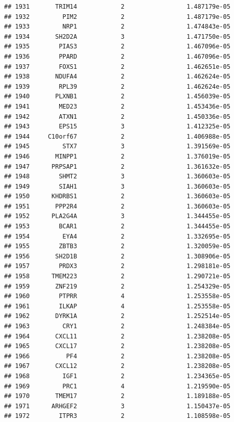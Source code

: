 \documentclass[
]{article}
\begin{document}
\begin{verbatim}
## 1931       TRIM14            2                 1.487179e-05
## 1932         PIM2            2                 1.487179e-05
## 1933         NRP1            2                 1.474843e-05
## 1934       SH2D2A            3                 1.471750e-05
## 1935        PIAS3            2                 1.467096e-05
## 1936        PPARD            2                 1.467096e-05
## 1937        FOXS1            2                 1.462651e-05
## 1938       NDUFA4            2                 1.462624e-05
## 1939        RPL39            2                 1.462624e-05
## 1940       PLXNB1            2                 1.456039e-05
## 1941        MED23            2                 1.453436e-05
## 1942        ATXN1            2                 1.450336e-05
## 1943        EPS15            3                 1.412325e-05
## 1944     C10orf67            2                 1.406988e-05
## 1945         STX7            3                 1.391569e-05
## 1946       MINPP1            2                 1.376019e-05
## 1947      PRPSAP1            2                 1.361632e-05
## 1948        SHMT2            3                 1.360603e-05
## 1949        SIAH1            3                 1.360603e-05
## 1950      KHDRBS1            2                 1.360603e-05
## 1951       PPP2R4            2                 1.360603e-05
## 1952      PLA2G4A            3                 1.344455e-05
## 1953        BCAR1            2                 1.344455e-05
## 1954         EYA4            2                 1.332695e-05
## 1955        ZBTB3            2                 1.320059e-05
## 1956       SH2D1B            2                 1.308906e-05
## 1957        PRDX3            2                 1.298181e-05
## 1958      TMEM223            2                 1.290721e-05
## 1959       ZNF219            2                 1.254329e-05
## 1960        PTPRR            4                 1.253558e-05
## 1961        ILKAP            4                 1.253558e-05
## 1962       DYRK1A            2                 1.252514e-05
## 1963         CRY1            2                 1.248384e-05
## 1964       CXCL11            2                 1.238208e-05
## 1965       CXCL17            2                 1.238208e-05
## 1966          PF4            2                 1.238208e-05
## 1967       CXCL12            2                 1.238208e-05
## 1968         IGF1            2                 1.234365e-05
## 1969         PRC1            4                 1.219590e-05
## 1970       TMEM17            2                 1.189188e-05
## 1971      ARHGEF2            3                 1.150437e-05
## 1972        ITPR3            2                 1.108598e-05

\end{verbatim}
\end{document}

